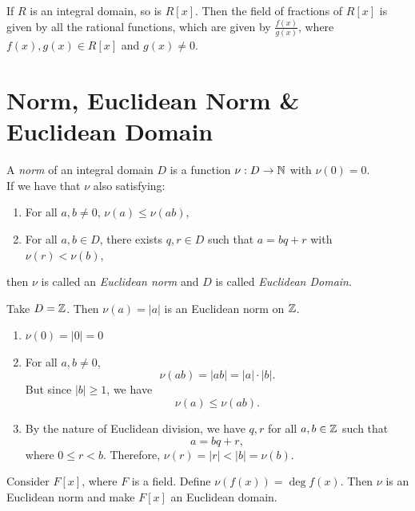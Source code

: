 \begin{eg}
    If $R$ is an integral domain, so is $R[x]$. Then the field of fractions of $R[x]$ is given by all the rational functions, which are given by $\frac{f(x)}{g(x)}$, where $f(x), g(x) \in R[x]$ and $g(x) \neq 0$.
\end{eg}
\section{Norm, Euclidean Norm \& Euclidean Domain}
\begin{definition}
    A \textit{norm} of an integral domain $D$ is a function $\nu : D \rightarrow \mathbb{N}$ with $\nu (0) = 0$.\\
    If we have that $\nu$ also satisfying:
    \begin{enumerate}
        \item For all $a,b \neq 0$, $\nu(a) \le \nu(ab)$,
        \item For all $a,b\in D$, there exists $q, r \in D$ such that $a = bq + r$ with $\nu(r) < \nu(b)$,
    \end{enumerate}
    then $\nu$ is called an \textit{Euclidean norm} and $D$ is called \textit{Euclidean Domain}.
\end{definition}
\begin{eg}
    Take $D = \mathbb{Z}$. Then $\nu(a) = |a|$ is an Euclidean norm on $\mathbb{Z}$.\\
\end{eg}
\begin{explanation}
    \begin{enumerate}
        \item $\nu(0) = |0| = 0$
        \item For all $a, b \neq 0$, \[\nu(ab) = |ab| = |a|\cdot|b|.\] But since $|b| \ge 1$, we have \[\nu(a) \le \nu(ab).\]
        \item By the nature of Euclidean division, we have $q, r$ for all $a, b \in \mathbb{Z}$ such that \[a = bq + r,\] where $0 \le r < b$. Therefore, $\nu(r) = |r| < |b| = \nu(b)$.
    \end{enumerate}
\end{explanation}
\begin{eg}
    Consider $F[x]$, where $F$ is a field. Define $\nu(f(x)) = \deg f(x)$. Then $\nu$ is an Euclidean norm and make $F[x]$ an Euclidean domain.
\end{eg}
